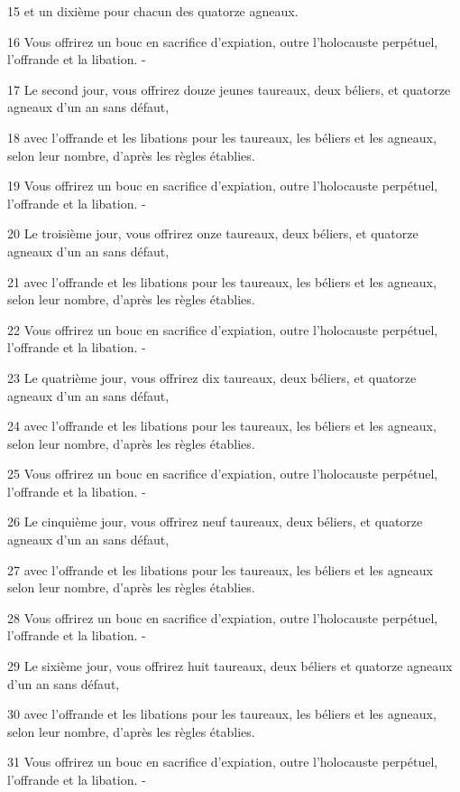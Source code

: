 \par 15 et un dixième pour chacun des quatorze agneaux.
\par 16 Vous offrirez un bouc en sacrifice d'expiation, outre l'holocauste perpétuel, l'offrande et la libation. -
\par 17 Le second jour, vous offrirez douze jeunes taureaux, deux béliers, et quatorze agneaux d'un an sans défaut,
\par 18 avec l'offrande et les libations pour les taureaux, les béliers et les agneaux, selon leur nombre, d'après les règles établies.
\par 19 Vous offrirez un bouc en sacrifice d'expiation, outre l'holocauste perpétuel, l'offrande et la libation. -
\par 20 Le troisième jour, vous offrirez onze taureaux, deux béliers, et quatorze agneaux d'un an sans défaut,
\par 21 avec l'offrande et les libations pour les taureaux, les béliers et les agneaux, selon leur nombre, d'après les règles établies.
\par 22 Vous offrirez un bouc en sacrifice d'expiation, outre l'holocauste perpétuel, l'offrande et la libation. -
\par 23 Le quatrième jour, vous offrirez dix taureaux, deux béliers, et quatorze agneaux d'un an sans défaut,
\par 24 avec l'offrande et les libations pour les taureaux, les béliers et les agneaux, selon leur nombre, d'après les règles établies.
\par 25 Vous offrirez un bouc en sacrifice d'expiation, outre l'holocauste perpétuel, l'offrande et la libation. -
\par 26 Le cinquième jour, vous offrirez neuf taureaux, deux béliers, et quatorze agneaux d'un an sans défaut,
\par 27 avec l'offrande et les libations pour les taureaux, les béliers et les agneaux selon leur nombre, d'après les règles établies.
\par 28 Vous offrirez un bouc en sacrifice d'expiation, outre l'holocauste perpétuel, l'offrande et la libation. -
\par 29 Le sixième jour, vous offrirez huit taureaux, deux béliers et quatorze agneaux d'un an sans défaut,
\par 30 avec l'offrande et les libations pour les taureaux, les béliers et les agneaux, selon leur nombre, d'après les règles établies.
\par 31 Vous offrirez un bouc en sacrifice d'expiation, outre l'holocauste perpétuel, l'offrande et la libation. -
